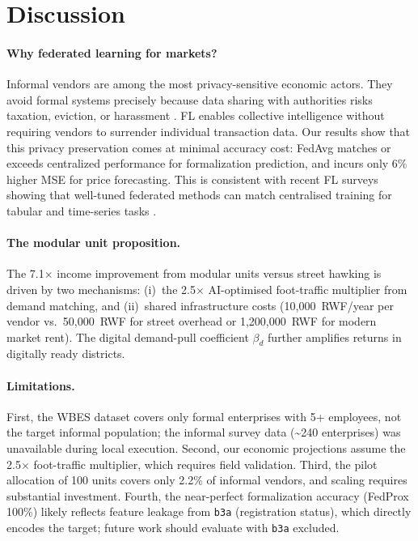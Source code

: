 \documentclass{article}
\begin{document}
\section{Discussion}
\label{sec:discussion}

\paragraph{Why federated learning for markets?}
Informal vendors are among the most privacy-sensitive economic actors. They avoid formal systems precisely because data sharing with authorities risks taxation, eviction, or harassment \cite{chen2023rethinking}.
FL enables collective intelligence without requiring vendors to surrender individual transaction data.
Our results show that this privacy preservation comes at minimal accuracy cost: FedAvg matches or exceeds centralized performance for formalization prediction, and incurs only 6\% higher MSE for price forecasting.
This is consistent with recent FL surveys showing that well-tuned federated methods can match centralised training for tabular and time-series tasks \cite{kairouz2021advances,wen2023survey}.

\paragraph{The modular unit proposition.}
The 7.1$\times$ income improvement from modular units versus street hawking is driven by two mechanisms: (i)~the 2.5$\times$ AI-optimised foot-traffic multiplier from demand matching, and (ii)~shared infrastructure costs (10,000~RWF/year per vendor vs.\ 50,000~RWF for street overhead or 1,200,000~RWF for modern market rent).
The digital demand-pull coefficient $\beta_d$ further amplifies returns in digitally ready districts.

\paragraph{Limitations.}
First, the WBES dataset covers only formal enterprises with 5+ employees, not the target informal population; the informal survey data (\textasciitilde 240 enterprises) was unavailable during local execution.
Second, our economic projections assume the 2.5$\times$ foot-traffic multiplier, which requires field validation.
Third, the pilot allocation of 100 units covers only 2.2\% of informal vendors, and scaling requires substantial investment.
Fourth, the near-perfect formalization accuracy (FedProx 100\%) likely reflects feature leakage from \texttt{b3a} (registration status), which directly encodes the target; future work should evaluate with \texttt{b3a} excluded.
\end{document}
